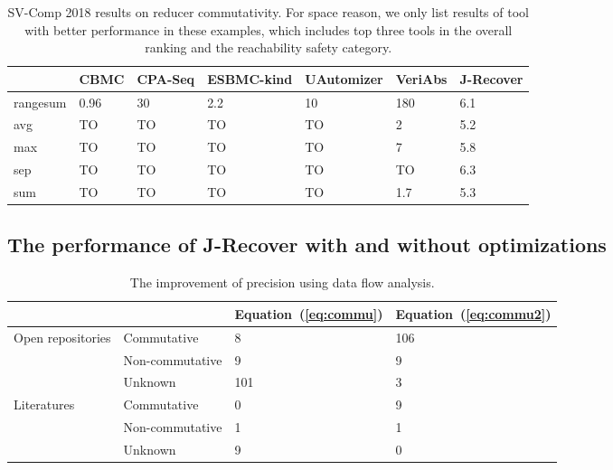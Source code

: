 \documentclass{llncs}
\begin{document}
\begin{table}
	\begin{tabular}{|l|l|l|l|l|l|l|}
\hline
							   & \small CBMC\cite{cbmc2} 	& \small CPA-Seq\cite{cpachecker} & \small  ESBMC-kind\cite{esbmc} & \small  UAutomizer\cite{uautomizer} &\small  VeriAbs\cite{veriabs} &\small J-Recover\\
\hline
\hline
\small \textsf{rangesum}	& 0.96 	   & 30 		 & 2.2 				 &  10				 & 180       &6.1\\
\hline
\small \textsf{avg}			 &  TO      &  TO		  &  TO				 &  TO				 &  2          &5.2\\
\hline
\small \textsf{max}		    &  TO      &  TO		 &  TO				& TO				 &  7         &5.8\\
\hline
\small \textsf{sep}		     &  TO      &  TO		  &  TO				 & TO				 &  TO        &6.3\\
\hline
\small \textsf{sum}		    &  TO      &  TO		 &  TO				& TO				&  1.7       &5.3\\
\hline
	\end{tabular}
	\caption{SV-Comp 2018 results on reducer commutativity. For space reason, we only list results of tool with better performance in these examples, which includes top three tools in the overall ranking and the reachability safety category.}
	\label{tab:svcomp}
\end{table}

\subsection{The performance of J-Recover with and without optimizations}

\begin{table}
	\centering
	\begin{tabular}{|l|l|l|l|}
		\hline
		& &Equation~(\ref{eq:commu})	& Equation~(\ref{eq:commu2}) \\
		\hline
		\hline
		\multirow{3}{*}{Open repositories}&Commutative& 8&106\\ 
		\cline{2-4}
		&Non-commutative&9&9\\
		\cline{2-4}
		&Unknown&101&3\\
		\hline
		\hline
		\multirow{3}{*}{Literatures}&Commutative& 0&9\\
		\cline{2-4}
		&Non-commutative&1&1\\
		\cline{2-4}
		&Unknown&9&0\\
		\hline
	\end{tabular}
	\caption{The improvement of precision using data flow analysis.}
	\label{tab:opt1}
\end{table}







\end{document}
